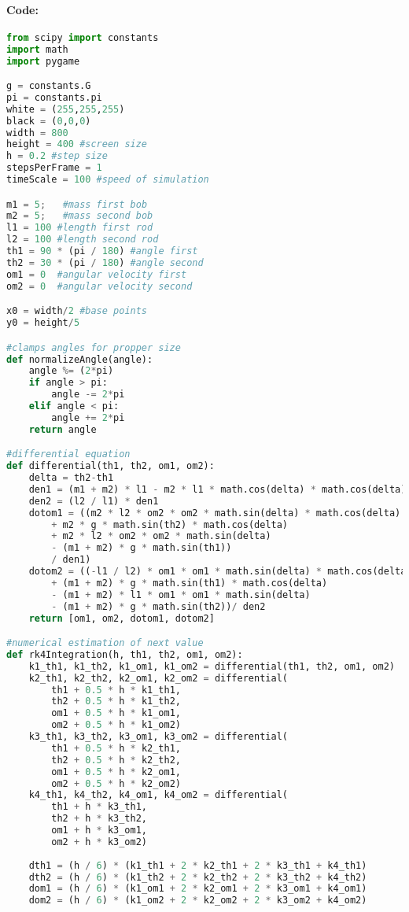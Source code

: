 \documentclass[12pt]{article}
\begin{document}
\paragraph{Code:}
\begin{lstlisting}[language=Python]
from scipy import constants
import math
import pygame

g = constants.G
pi = constants.pi
white = (255,255,255)
black = (0,0,0)
width = 800
height = 400 #screen size
h = 0.2 #step size
stepsPerFrame = 1
timeScale = 100 #speed of simulation

m1 = 5;   #mass first bob
m2 = 5;   #mass second bob
l1 = 100 #length first rod
l2 = 100 #length second rod
th1 = 90 * (pi / 180) #angle first
th2 = 30 * (pi / 180) #angle second
om1 = 0  #angular velocity first
om2 = 0  #angular velocity second

x0 = width/2 #base points
y0 = height/5

#clamps angles for propper size
def normalizeAngle(angle):
    angle %= (2*pi)
    if angle > pi:
        angle -= 2*pi
    elif angle < pi:
        angle += 2*pi
    return angle

#differential equation
def differential(th1, th2, om1, om2):
    delta = th2-th1
    den1 = (m1 + m2) * l1 - m2 * l1 * math.cos(delta) * math.cos(delta)
    den2 = (l2 / l1) * den1
    dotom1 = ((m2 * l2 * om2 * om2 * math.sin(delta) * math.cos(delta)
        + m2 * g * math.sin(th2) * math.cos(delta)
        + m2 * l2 * om2 * om2 * math.sin(delta)
        - (m1 + m2) * g * math.sin(th1))
        / den1)
    dotom2 = ((-l1 / l2) * om1 * om1 * math.sin(delta) * math.cos(delta)
        + (m1 + m2) * g * math.sin(th1) * math.cos(delta)
        - (m1 + m2) * l1 * om1 * om1 * math.sin(delta)
        - (m1 + m2) * g * math.sin(th2))/ den2
    return [om1, om2, dotom1, dotom2]

#numerical estimation of next value
def rk4Integration(h, th1, th2, om1, om2):
    k1_th1, k1_th2, k1_om1, k1_om2 = differential(th1, th2, om1, om2)
    k2_th1, k2_th2, k2_om1, k2_om2 = differential(
        th1 + 0.5 * h * k1_th1,
        th2 + 0.5 * h * k1_th2,
        om1 + 0.5 * h * k1_om1,
        om2 + 0.5 * h * k1_om2)
    k3_th1, k3_th2, k3_om1, k3_om2 = differential(
        th1 + 0.5 * h * k2_th1,
        th2 + 0.5 * h * k2_th2,
        om1 + 0.5 * h * k2_om1,
        om2 + 0.5 * h * k2_om2)
    k4_th1, k4_th2, k4_om1, k4_om2 = differential(
        th1 + h * k3_th1,
        th2 + h * k3_th2,
        om1 + h * k3_om1,
        om2 + h * k3_om2)
    
    dth1 = (h / 6) * (k1_th1 + 2 * k2_th1 + 2 * k3_th1 + k4_th1)
    dth2 = (h / 6) * (k1_th2 + 2 * k2_th2 + 2 * k3_th2 + k4_th2)
    dom1 = (h / 6) * (k1_om1 + 2 * k2_om1 + 2 * k3_om1 + k4_om1)
    dom2 = (h / 6) * (k1_om2 + 2 * k2_om2 + 2 * k3_om2 + k4_om2)


\end{lstlisting}
\end{document}
